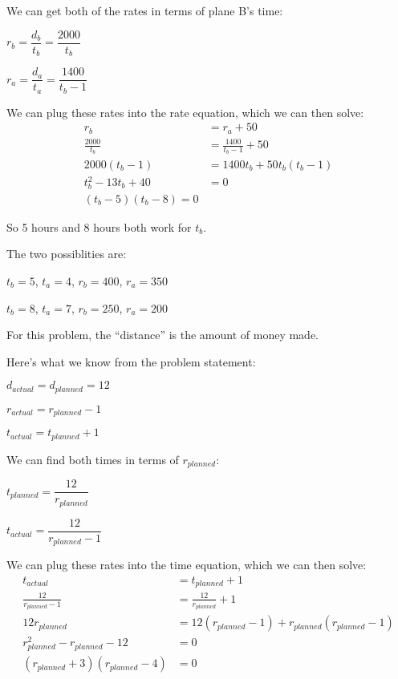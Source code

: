 \documentclass[fleqn,addpoints]{exam}
\begin{document}
\begin{description}
We can get both of the rates in terms of plane B's time:
\begin{itemize*}
  \item $r_b = \dfrac{d_b}{t_b} = \dfrac{2000}{t_b}$
  \item $r_a = \dfrac{d_a}{t_a} = \dfrac{1400}{t_b - 1}$
\end{itemize*}

We can plug these rates into the rate equation, which we can then solve:
\begin{align*}
  r_b &= r_a + 50 \\
  \frac{2000}{t_b} &= \frac{1400}{t_b - 1} + 50 \\
  2000(t_b-1) &= 1400t_b + 50t_b(t_b-1) \\
  t_b^2 - 13t_b + 40 &= 0 \\
  (t_b-5)(t_b-8) = 0
\end{align*}

So 5 hours and 8 hours both work for $t_b$.

The two possiblities are:
\begin{itemize*}
  \item $t_b=5$, $t_a=4$, $r_b=400$, $r_a=350$
  \item $t_b=8$, $t_a=7$, $r_b=250$, $r_a=200$
\end{itemize*}

\item[55]
For this problem, the ``distance'' is the amount of money made.

Here's what we know from the problem statement:
\begin{itemize*}
  \item $d_{actual} = d_{planned} = 12$
  \item $r_{actual} = r_{planned} - 1$
  \item $t_{actual} = t_{planned} + 1$
\end{itemize*}

We can find both times in terms of $r_{planned}$:
\begin{itemize*}
  \item $t_{planned} = \dfrac{12}{r_{planned}}$
  \item $t_{actual} = \dfrac{12}{r_{planned} - 1}$
\end{itemize*}

We can plug these rates into the time equation, which we can then solve:
\begin{align*}
  t_{actual} &= t_{planned} + 1 \\
  \frac{12}{r_{planned} - 1} &= \frac{12}{r_{planned}} + 1 \\
  12r_{planned} &= 12(r_{planned} - 1) + r_{planned}(r_{planned} - 1) \\
  r_{planned}^2 - r_{planned} - 12 &= 0 \\
  (r_{planned} + 3)(r_{planned} - 4) &= 0 \\
\end{align*}


\end{description}
\end{document}
